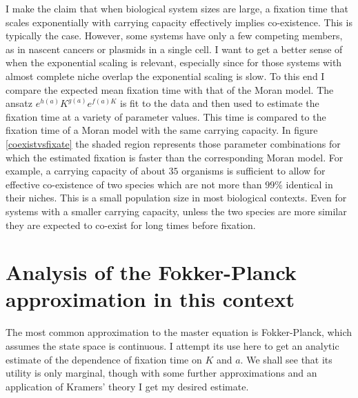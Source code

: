 I make the claim that when biological system sizes are large, a fixation time that scales exponentially with carrying capacity effectively implies co-existence. 
This is typically the case. 
However, some systems have only a few competing members, as in nascent cancers or plasmids in a single cell. 
I want to get a better sense of when the exponential scaling is relevant, especially since for those systems with almost complete niche overlap the exponential scaling is slow. 
To this end I compare the expected mean fixation time with that of the Moran model. 
The ansatz $e^{h(a)}K^{g(a)}e^{f(a)K}$ is fit to the data and then used to estimate the fixation time at a variety of parameter values. 
This time is compared to the fixation time of a Moran model with the same carrying capacity. 
In figure \ref{coexistvsfixate} the shaded region represents those parameter combinations for which the estimated fixation is faster than the corresponding Moran model. 
For example, a carrying capacity of about $35$ organisms is sufficient to allow for effective co-existence of two species which are not more than $99\%$ identical in their niches. This is a small population size in most biological contexts. 
Even for systems with a smaller carrying capacity, unless the two species are more similar they are expected to co-exist for long times before fixation. 


\section{Analysis of the Fokker-Planck approximation in this context} \label{FPsection}
The most common approximation to the master equation is Fokker-Planck, which assumes the state space is continuous. 
I attempt its use here to get an analytic estimate of the dependence of fixation time on $K$ and $a$. 
We shall see that its utility is only marginal, though with some further approximations and an application of Kramers' theory I get my desired estimate. 

